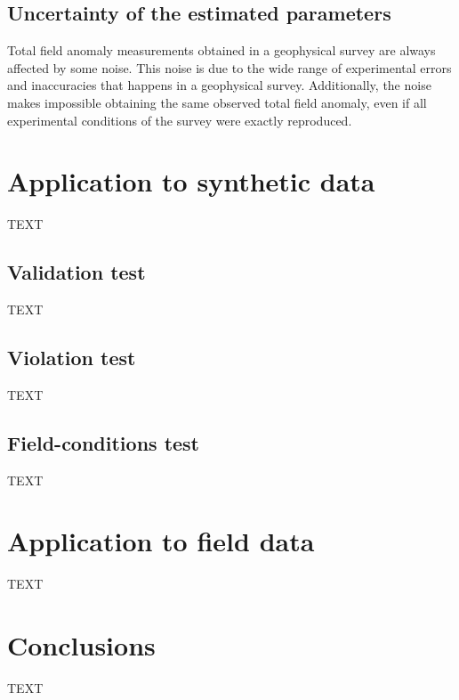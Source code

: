 \documentclass[journal abbreviation, npg]{copernicus}
\begin{document}
\subsection{Uncertainty of the estimated parameters}

Total field anomaly measurements obtained in a geophysical survey are always affected by some noise. This noise is due to the wide range of experimental errors and inaccuracies that happens in a geophysical survey. Additionally, the noise makes impossible obtaining the same observed total field anomaly, even if all experimental conditions of the survey were exactly reproduced. 

\section{Application to synthetic data}
TEXT

\subsection{Validation test}
TEXT

\subsection{Violation test}
TEXT

\subsection{Field-conditions test}
TEXT

\section{Application to field data}
TEXT

\section{Conclusions}
TEXT


\end{document}
